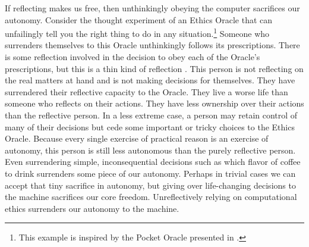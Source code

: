 \begin{isabellebody}
\begin{isamarkuptext}
If reflecting makes us free, then unthinkingly obeying the computer sacrifices our autonomy. Consider 
the thought experiment of an Ethics Oracle that can unfailingly tell you the right thing to do in any 
situation.\footnote{This example is inspired by the Pocket Oracle presented in \citet{bok}.} Someone 
who surrenders themselves to this Oracle unthinkingly follows its prescriptions. 
There is some reflection involved in the decision to obey each of the Oracle’s prescriptions, but 
this is a thin kind of reflection \citep{bok}. This person is not reflecting on the real matters at hand and is 
not making decisions for themselves. They have surrendered their reflective capacity to the Oracle. 
They live a worse life than someone who reflects on their actions. They have less ownership over their 
actions than the reflective person. In a less extreme case, a person may retain control of many of 
their decisions but cede some important or tricky choices to the Ethics Oracle. Because every single 
exercise of practical reason is an exercise of autonomy, this person is still less autonomous than the 
purely reflective person. Even surrendering simple, inconsequential decisions such as which flavor of 
coffee to drink surrenders some piece of our autonomy. Perhaps in trivial cases we can accept that 
tiny sacrifice in autonomy, but giving over life-changing decisions to the machine sacrifices our 
core freedom. Unreflectively relying on computational ethics surrenders our autonomy to the machine. 


\end{isamarkuptext}
\end{isabellebody}
